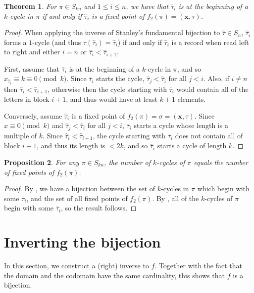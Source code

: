 \documentclass{article}
\newtheorem{theorem}{Theorem}[section]
\numberwithin{theorem}{section}
\newtheorem{proposition}[theorem]{Proposition}
\theoremstyle{definition}
\newcommand\taubar{\overline\tau}
\newcommand{\x}{\mathbf x}
\newcommand{\xtau}{(\x,\tau)}
\begin{document}
\begin{theorem}\label{lem:fixed-points}
    For $\pi \in S_{kn}$ and $1 \le i \le n$, we have that $\taubar_i$ is at the beginning of a $k$-cycle in $\pi$ if and only if $\hat\tau_i$ is a fixed point of $f_2(\pi) = \xtau$.
\end{theorem}
\begin{proof}
    When applying the inverse of Stanley's fundamental bijection to $\hat\tau \in S_n$, $\hat\tau_i$ forms a $1$-cycle (and thus $\tau(\hat\tau_i) = \hat\tau_i$) if and only if $\hat\tau_i$ is a record when read left to right and either $i=n$ or $\hat\tau_i < \hat\tau_{i+1}$.

    First, assume that $\taubar_i$ is at the beginning of a $k$-cycle in $\pi$, and so $x_{\hat\tau_i} \equiv k\equiv 0\pmod k$. Since $\taubar_i$ starts the cycle, $\hat\tau_j < \hat\tau_i$ for all $j < i$. Also, if $i \neq n$ then $\hat\tau_i < \hat\tau_{i+1}$, otherwise then the cycle starting with $\taubar_i$ would contain all of the letters in block $i+1$, and thus would have at least $k + 1$ elements.

    Conversely, assume $\hat\tau_i$ is a fixed point of $f_2(\pi) = \sigma = \xtau$. Since $x \equiv 0 \pmod k$ and $\hat\tau_j < \hat\tau_i$ for all $j < i$, $\taubar_i$ starts a cycle whose length is a multiple of $k$. Since $\hat\tau_i < \hat\tau_{i+1}$, the cycle starting with $\taubar_i$ does not contain all of block $i+1$, and thus its length is $< 2k$, and so $\taubar_i$ starts a cycle of length $k$.
\end{proof}

\begin{proposition}\label{prop:k-cycle-fixed-pts}
    For any $\pi \in S_{kn}$, the number of $k$-cycles of $\pi$ equals the number of fixed points of $f_2(\pi)$.
\end{proposition}
\begin{proof}
    By , we have a bijection between the set of $k$-cycles in $\pi$ which begin with some $\taubar_i$, and the set of all fixed points of $f_2(\pi)$. By , all of the $k$-cycles of $\pi$ begin with some $\taubar_i$, so the result follows.
\end{proof}

\section{Inverting the bijection}
\label{sec:Bijection}
In this section, we construct a (right) inverse to $f$. Together with the fact that the domain and the codomain have the same cardinality, this shows that $f$ is a bijection.
\end{document}
